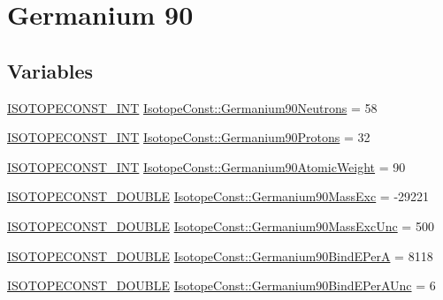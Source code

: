 \hypertarget{group___isotope_const-_germanium-_ge90}{}\section{Germanium 90}
\label{group___isotope_const-_germanium-_ge90}
\subsection*{Variables}
\begin{DoxyCompactItemize}
\item 
\mbox{\hyperlink{group___isotope_const-_macros_ga5f18360b3e99483a35c32d789e62621c}{I\+S\+O\+T\+O\+P\+E\+C\+O\+N\+S\+T\+\_\+\+I\+NT}} \mbox{\hyperlink{group___isotope_const-_germanium-_ge90_gae428ba4c23c5a685429de75bba9a40f4}{Isotope\+Const\+::\+Germanium90\+Neutrons}} = 58
\item 
\mbox{\hyperlink{group___isotope_const-_macros_ga5f18360b3e99483a35c32d789e62621c}{I\+S\+O\+T\+O\+P\+E\+C\+O\+N\+S\+T\+\_\+\+I\+NT}} \mbox{\hyperlink{group___isotope_const-_germanium-_ge90_gaa5a9782d05bbbf40ab7de548ad762a7b}{Isotope\+Const\+::\+Germanium90\+Protons}} = 32
\item 
\mbox{\hyperlink{group___isotope_const-_macros_ga5f18360b3e99483a35c32d789e62621c}{I\+S\+O\+T\+O\+P\+E\+C\+O\+N\+S\+T\+\_\+\+I\+NT}} \mbox{\hyperlink{group___isotope_const-_germanium-_ge90_ga7f4f88f50578589ab4432419ccce3417}{Isotope\+Const\+::\+Germanium90\+Atomic\+Weight}} = 90
\item 
\mbox{\hyperlink{group___isotope_const-_macros_ga8f45a7272ce02c0b4c65c44636ed719a}{I\+S\+O\+T\+O\+P\+E\+C\+O\+N\+S\+T\+\_\+\+D\+O\+U\+B\+LE}} \mbox{\hyperlink{group___isotope_const-_germanium-_ge90_ga2962354c662b5932cd9478e92deb7401}{Isotope\+Const\+::\+Germanium90\+Mass\+Exc}} = -\/29221
\item 
\mbox{\hyperlink{group___isotope_const-_macros_ga8f45a7272ce02c0b4c65c44636ed719a}{I\+S\+O\+T\+O\+P\+E\+C\+O\+N\+S\+T\+\_\+\+D\+O\+U\+B\+LE}} \mbox{\hyperlink{group___isotope_const-_germanium-_ge90_gaaf7ddcd974afec8a140654b357a761a6}{Isotope\+Const\+::\+Germanium90\+Mass\+Exc\+Unc}} = 500
\item 
\mbox{\hyperlink{group___isotope_const-_macros_ga8f45a7272ce02c0b4c65c44636ed719a}{I\+S\+O\+T\+O\+P\+E\+C\+O\+N\+S\+T\+\_\+\+D\+O\+U\+B\+LE}} \mbox{\hyperlink{group___isotope_const-_germanium-_ge90_gac9ab75f606b60c91de4aa324fabcc825}{Isotope\+Const\+::\+Germanium90\+Bind\+E\+PerA}} = 8118
\item 
\mbox{\hyperlink{group___isotope_const-_macros_ga8f45a7272ce02c0b4c65c44636ed719a}{I\+S\+O\+T\+O\+P\+E\+C\+O\+N\+S\+T\+\_\+\+D\+O\+U\+B\+LE}} \mbox{\hyperlink{group___isotope_const-_germanium-_ge90_gaee2b58c808b729a075421f7578ff5fa9}{Isotope\+Const\+::\+Germanium90\+Bind\+E\+Per\+A\+Unc}} = 6

\end{DoxyCompactItemize}
